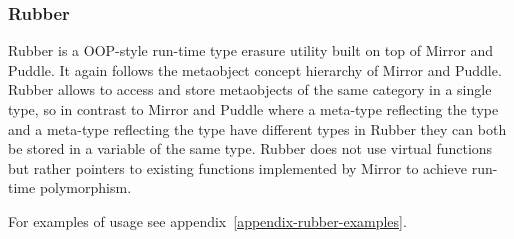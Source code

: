 \subsubsection{Rubber}

Rubber is a OOP-style run-time type erasure utility built on top
of Mirror and Puddle. It again follows the metaobject concept hierarchy of Mirror and Puddle.
Rubber allows to access and store metaobjects of the same category in a single
type, so in contrast to Mirror and Puddle where a meta-type reflecting the \verb@int@
type and a meta-type reflecting the \verb@double@ type have different types
in Rubber they can both be stored in a variable of the same type.
Rubber does not use virtual functions but rather pointers to existing
functions implemented by Mirror to achieve run-time polymorphism.

For examples of usage see appendix~\ref{appendix-rubber-examples}.
